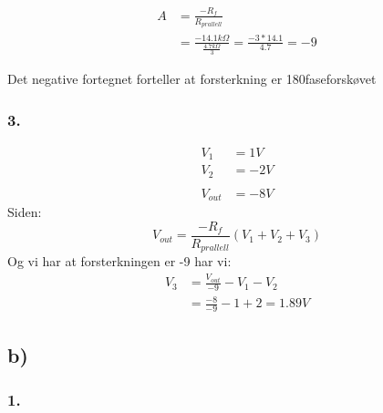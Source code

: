 \documentclass[a4paper, norsk, twoside, 10pt]{article}
\begin{document}
\begin{align*}
  A &= \frac{-R_{f}}{R_{prallell}} \\
  &= \frac{-14.1k\Omega}{\frac{4.7k\Omega}{3}}  = \frac{-3*14.1}{4.7}  = -9
\end{align*}

Det negative fortegnet forteller at forsterkning er 180\degree faseforskøvet



\subsubsection*{3.}
\begin{align*}
  V_{1} &= 1V \\
  V_{2} &= -2V\\
  \\
  V_{out} &= -8V
\end{align*}
Siden:
\[V_{out} = \frac{-R_{f}}{R_{prallell}} (V_{1} + V_{2} + V_{3})\]
Og vi har at forsterkningen er -9 har vi:
\begin{align*}
  V_{3} &= \frac{V_{out}}{-9}- V_{1} - V_{2} \\
  &= \frac{-8}{-9}- 1 + 2 = 1.89 V
\end{align*}


\subsection*{b)}
\subsubsection*{1.}
\end{document}
